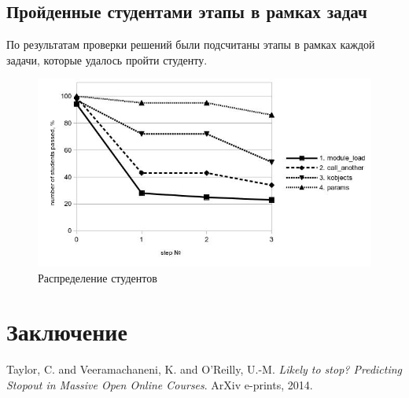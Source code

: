 \documentclass[a4paper,12pt]{article}
\begin{document}
\subsection{Пройденные студентами этапы в рамках задач}
По результатам проверки решений были подсчитаны этапы в рамках каждой задачи, которые удалось пройти студенту.

\begin{figure}[h]
	\centering
	\includegraphics[width=\textwidth]{steps.jpg}
	\caption{Распределение студентов}
	\label{fig:mesh4}
\end{figure}

\section{Заключение}

\begin{thebibliography}{9}	
	{Taylor}, C. and {Veeramachaneni}, K. and {O'Reilly}, U.-M.
	\textit{Likely to stop? Predicting Stopout in Massive Open Online Courses}.
	ArXiv e-prints, 2014.
\end{thebibliography}
\end{document}
